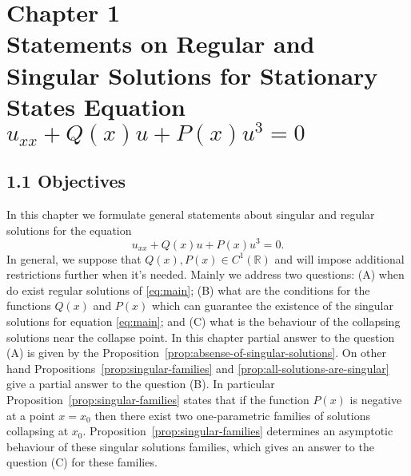 \chapter*{{\normalfont Chapter 1} \\ Statements on Regular and Singular Solutions for Stationary States Equation $u_{xx} + Q(x) u + P(x) u^3 = 0$}
\label{chapter:I}

\section*{1.1 Objectives}

In this chapter we formulate general statements about singular and regular solutions for the equation
\begin{equation}
	u_{xx} + Q(x) u + P(x) u^3 = 0.
	\label{eq:main}
\end{equation}
In general, we suppose that $Q(x), P(x) \in C^1(\mathbb{R})$ and will impose additional restrictions further when it's needed.
Mainly we address two questions: (A) when do exist regular solutions of \eqref{eq:main}; (B) what are the conditions for the functions $Q(x)$ and $P(x)$ which can guarantee the existence of the singular solutions for equation \eqref{eq:main}; and (C) what is the behaviour of the collapsing solutions near the collapse point.
In this chapter partial answer to the question (A) is given by the Proposition~\ref{prop:absense-of-singular-solutions}.
On other hand Propositions~\ref{prop:singular-families} and \ref{prop:all-solutions-are-singular} give a partial answer to the question (B).
In particular Proposition~\ref{prop:singular-families} states that if the function $P(x)$ is negative at a point $x = x_0$ then there exist two one-parametric families of solutions collapsing at $x_0$.
Proposition~\ref{prop:singular-families} determines an asymptotic behaviour of these singular solutions families, which gives an answer to the question (C) for these families.

